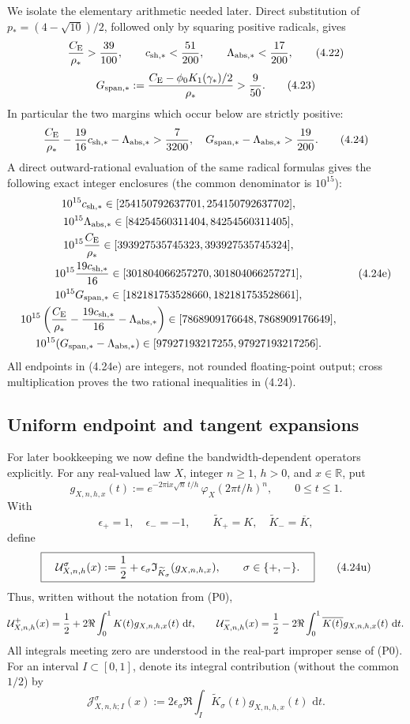 \documentclass[11pt,a4paper]{article}
\numberwithin{equation}{section}
\theoremstyle{definition}
\theoremstyle{remark}
\newcommand{\ii}{\mathrm i}
\newcommand{\dd}{\,\mathrm d}
\newcommand{\CE}{C_{\mathrm E}}
\begin{document}
We isolate the elementary arithmetic needed later.  Direct substitution of
$p_*=(4-\sqrt {10})/2$, followed only by squaring positive radicals, gives
\[
 {\CE\over\rho_*}>{39\over100},\qquad
 c_{\rm sh,*}<{51\over200},
 \qquad \Lambda_{\rm abs,*}<{17\over200},             \tag{4.22}
\]
\[
 G_{\rm span,*}:={\CE-\phi_0K_1(\gamma_*)/2\over\rho_*}
 >{9\over50}.                                          \tag{4.23}
\]
In particular the two margins which occur below are strictly positive:
\[
 {\CE\over\rho_*}-{19\over16}c_{\rm sh,*}
                    -\Lambda_{\rm abs,*}>{7\over3200},
 \quad
 G_{\rm span,*}-\Lambda_{\rm abs,*}>{19\over200}.     \tag{4.24}
\]
A direct outward-rational evaluation of the same radical formulas gives the
following exact integer enclosures (the common denominator is $10^{15}$):
\[
\begin{gathered}
10^{15}c_{\rm sh,*}\in[254150792637701,254150792637702],\\
10^{15}\Lambda_{\rm abs,*}\in[84254560311404,84254560311405],\\
10^{15}{\CE\over\rho_*}\in[393927535745323,393927535745324],\\
10^{15}{19c_{\rm sh,*}\over16}\in[301804066257270,301804066257271],\\
10^{15}G_{\rm span,*}\in[182181753528660,182181753528661],\\
10^{15}\left({\CE\over\rho_*}-{19c_{\rm sh,*}\over16}
 -\Lambda_{\rm abs,*}\right)
 \in[7868909176648,7868909176649],\\
10^{15}(G_{\rm span,*}-\Lambda_{\rm abs,*})
 \in[97927193217255,97927193217256].
\end{gathered}                                               \tag{4.24e}
\]
All endpoints in (4.24e) are integers, not rounded floating-point output;
cross multiplication proves the two rational inequalities in (4.24).

\subsection*{Uniform endpoint and tangent expansions}

For later bookkeeping we now define the bandwidth-dependent operators
explicitly.  For any real-valued law $X$, integer $n\ge1$, $h>0$, and
$x\in\mathbb R$, put
\[
 g_{X,n,h,x}(t):=
 e^{-2\pi\ii x\sqrt n\,t/h}\,
 \varphi_X(2\pi t/h)^n,\qquad 0\le t\le1.
\]
With
\[
 \epsilon_+=1,\quad\epsilon_-=-1,\qquad
 \widetilde K_+=K,\quad\widetilde K_-=\overline K,
\]
define
\[
 \boxed{\quad
 \mathcal U^\sigma_{X,n,h}(x):=
 {1\over2}+\epsilon_\sigma
   \mathfrak I_{\widetilde K_\sigma}(g_{X,n,h,x}),
 \qquad \sigma\in\{+,-\}.
 \quad}                                                        \tag{4.24u}
\]
Thus, written without the notation from (P0),
\[
 \mathcal U^+_{X,n,h}(x)
 ={1\over2}+2\Re\int_0^1K(t)g_{X,n,h,x}(t)\,\dd t,\qquad
 \mathcal U^-_{X,n,h}(x)
 ={1\over2}-2\Re\int_0^1\overline {K(t)}g_{X,n,h,x}(t)\,\dd t.
\]
All integrals meeting zero are understood in the real-part improper sense
of (P0).  For an interval $I\subset[0,1]$, denote its integral contribution
(without the common $1/2$) by
\[
 \mathcal J^\sigma_{X,n,h;I}(x):=
 2\epsilon_\sigma\Re\int_I
 \widetilde K_\sigma(t)g_{X,n,h,x}(t)\,\dd t.             \tag{4.24v}
\]
\end{document}
